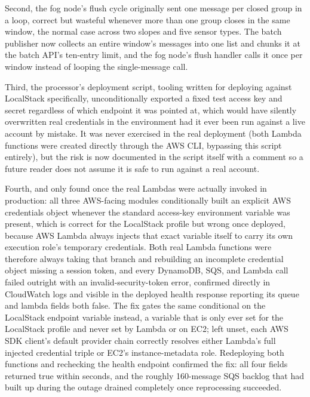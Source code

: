 \documentclass[conference]{IEEEtran}
\begin{document}
Second, the fog node's flush cycle originally sent one message per closed group in a loop, correct but wasteful whenever more than one group closes in the same window, the normal case across two slopes and five sensor types. The batch publisher now collects an entire window's messages into one list and chunks it at the batch API's ten-entry limit, and the fog node's flush handler calls it once per window instead of looping the single-message call.

Third, the processor's deployment script, tooling written for deploying against LocalStack specifically, unconditionally exported a fixed test access key and secret regardless of which endpoint it was pointed at, which would have silently overwritten real credentials in the environment had it ever been run against a live account by mistake. It was never exercised in the real deployment (both Lambda functions were created directly through the AWS CLI, bypassing this script entirely), but the risk is now documented in the script itself with a comment so a future reader does not assume it is safe to run against a real account.

Fourth, and only found once the real Lambdas were actually invoked in production: all three AWS-facing modules conditionally built an explicit AWS credentials object whenever the standard access-key environment variable was present, which is correct for the LocalStack profile but wrong once deployed, because AWS Lambda always injects that exact variable itself to carry its own execution role's temporary credentials. Both real Lambda functions were therefore always taking that branch and rebuilding an incomplete credential object missing a session token, and every DynamoDB, SQS, and Lambda call failed outright with an invalid-security-token error, confirmed directly in CloudWatch logs and visible in the deployed health response reporting its queue and lambda fields both false. The fix gates the same conditional on the LocalStack endpoint variable instead, a variable that is only ever set for the LocalStack profile and never set by Lambda or on EC2; left unset, each AWS SDK client's default provider chain correctly resolves either Lambda's full injected credential triple or EC2's instance-metadata role. Redeploying both functions and rechecking the health endpoint confirmed the fix: all four fields returned true within seconds, and the roughly 160-message SQS backlog that had built up during the outage drained completely once reprocessing succeeded.
\end{document}
